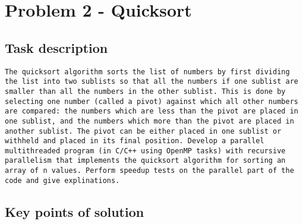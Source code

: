 \documentclass[a4paper,11pt]{article}
\begin{document}
\section*{Problem 2 - Quicksort}

\subsection*{Task description}

\begin{verbatim}
The quicksort algorithm sorts the list of numbers by first dividing the list into two sublists so that all the numbers if one sublist are smaller than all the numbers in the other sublist. This is done by selecting one number (called a pivot) against which all other numbers are compared: the numbers which are less than the pivot are placed in one sublist, and the numbers which more than the pivot are placed in another sublist. The pivot can be either placed in one sublist or withheld and placed in its final position. Develop a parallel multithreaded program (in C/C++ using OpenMP tasks) with recursive parallelism that implements the quicksort algorithm for sorting an array of n values. Perform speedup tests on the parallel part of the code and give explinations.
\end{verbatim}

\subsection*{Key points of solution}
\end{document}
